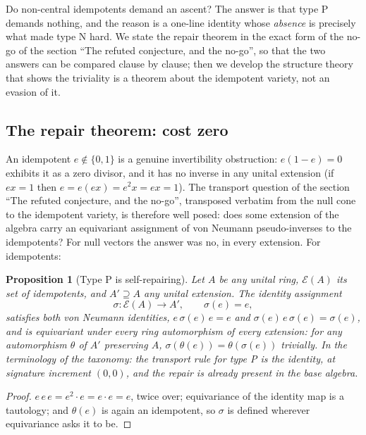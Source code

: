 \documentclass[11pt]{article}
\newtheorem{proposition}[theorem]{Proposition}
\theoremstyle{definition}
\theoremstyle{plain}
\begin{document}
\label{c:note.transport.setting-type-p-rule-no-rule}
Do non-central idempotents demand an ascent? The answer is that type P demands nothing, and the reason is a one-line identity whose \emph{absence} is precisely what made type N hard. We state the repair theorem in the exact form of the no-go of the section ``The refuted conjecture, and the no-go'', so that the two answers can be compared clause by clause; then we develop the structure theory that shows the triviality is a theorem about the idempotent variety, not an evasion of it.

\subsection*{The repair theorem: cost zero}
\label{c:note.transport.setting-repair-theorem-cost-zero}
An idempotent $e \notin \{0,1\}$ is a genuine invertibility obstruction: $e(1-e) = 0$ exhibits it as a zero divisor, and it has no inverse in any unital extension (if $ex = 1$ then $e = e(ex) = e^2 x = ex = 1$). The transport question of the section ``The refuted conjecture, and the no-go'', transposed verbatim from the null cone to the idempotent variety, is therefore well posed: does some extension of the algebra carry an equivariant assignment of von Neumann pseudo-inverses to the idempotents? For null vectors the answer was no, in every extension. For idempotents:

\begin{proposition}[Type P is self-repairing]\label{c:transport.type-p-self-repairing}
Let $A$ be any unital ring, $\mathcal{E}(A)$ its set of idempotents, and $A' \supseteq A$ any unital extension. The identity assignment
\[
\sigma : \mathcal{E}(A) \to A' , \qquad \sigma(e) = e,
\]
satisfies both von Neumann identities, $e\,\sigma(e)\,e = e$ and $\sigma(e)\,e\,\sigma(e) = \sigma(e)$, and is equivariant under \emph{every} ring automorphism of every extension: for any automorphism $\theta$ of $A'$ preserving $A$, $\sigma(\theta(e)) = \theta(\sigma(e))$ trivially. In the terminology of the taxonomy: the transport rule for type P is the identity, at signature increment $(0,0)$, and the repair is already present in the base algebra.
\end{proposition}
\begin{proof}
$e\,e\,e = e^2 \cdot e = e \cdot e = e$, twice over; equivariance of the identity map is a tautology; and $\theta(e)$ is again an idempotent, so $\sigma$ is defined wherever equivariance asks it to be.

\end{proof}
\end{document}
